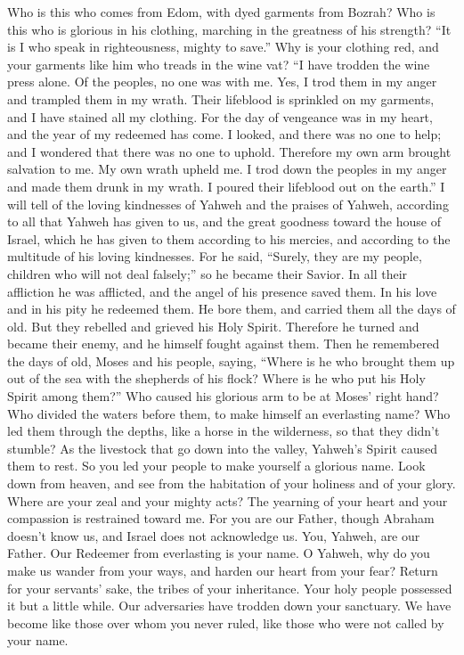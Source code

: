  Who is this who comes from Edom, with dyed garments from
Bozrah? Who is this who is glorious in his clothing, marching in the
greatness of his strength? ``It is I who speak in righteousness, mighty
to save.''  Why is your clothing red, and your garments
like him who treads in the wine vat?  ``I have trodden the
wine press alone. Of the peoples, no one was with me. Yes, I trod them
in my anger and trampled them in my wrath. Their lifeblood is sprinkled
on my garments, and I have stained all my clothing.  For
the day of vengeance was in my heart, and the year of my redeemed has
come.  I looked, and there was no one to help; and I
wondered that there was no one to uphold. Therefore my own arm brought
salvation to me. My own wrath upheld me.  I trod down the
peoples in my anger and made them drunk in my wrath. I poured their
lifeblood out on the earth.''  I will tell of the loving
kindnesses of Yahweh and the praises of Yahweh, according to all that
Yahweh has given to us, and the great goodness toward the house of
Israel, which he has given to them according to his mercies, and
according to the multitude of his loving kindnesses.  For
he said, ``Surely, they are my people, children who will not deal
falsely;'' so he became their Savior.  In all their
affliction he was afflicted, and the angel of his presence saved them.
In his love and in his pity he redeemed them. He bore them, and carried
them all the days of old.  But they rebelled and grieved
his Holy Spirit. Therefore he turned and became their enemy, and he
himself fought against them.  Then he remembered the days
of old, Moses and his people, saying, ``Where is he who brought them up
out of the sea with the shepherds of his flock? Where is he who put his
Holy Spirit among them?''  Who caused his glorious arm to
be at Moses' right hand? Who divided the waters before them, to make
himself an everlasting name?  Who led them through the
depths, like a horse in the wilderness, so that they didn't stumble?
 As the livestock that go down into the valley, Yahweh's
Spirit caused them to rest. So you led your people to make yourself a
glorious name.  Look down from heaven, and see from the
habitation of your holiness and of your glory. Where are your zeal and
your mighty acts? The yearning of your heart and your compassion is
restrained toward me.  For you are our Father, though
Abraham doesn't know us, and Israel does not acknowledge us. You,
Yahweh, are our Father. Our Redeemer from everlasting is your name.
 O Yahweh, why do you make us wander from your ways, and
harden our heart from your fear? Return for your servants' sake, the
tribes of your inheritance.  Your holy people possessed
it but a little while. Our adversaries have trodden down your sanctuary.
 We have become like those over whom you never ruled,
like those who were not called by your name.

